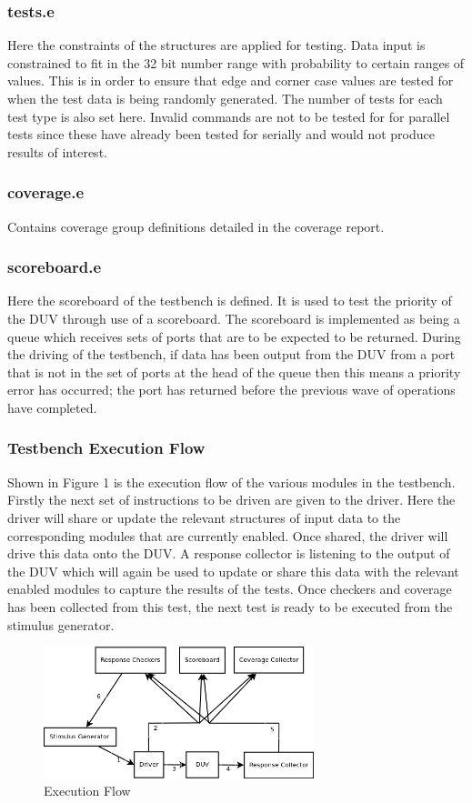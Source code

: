 \documentclass[a4paper]{article}
\begin{document}
\subsubsection*{tests.e}
\vspace{-0.7em}
Here the constraints of the structures are applied for testing. Data input is
constrained to fit in the 32 bit number range with probability to certain
ranges of values. This is in order to ensure that edge and corner case values
are tested for when the test data is being randomly generated. The number of
tests for each test type is also set here. Invalid commands are not to be
tested for for parallel tests since these have already been tested for serially
and would not produce results of interest.

\subsubsection*{coverage.e}
\vspace{-0.7em}
Contains coverage group definitions detailed in the coverage report.

\subsubsection*{scoreboard.e}
\vspace{-0.7em}
Here the scoreboard of the testbench is defined. It is used to test the
priority of the DUV through use of a scoreboard. The scoreboard is implemented
as being a queue which receives sets of ports that are to be expected to be
returned. During the driving of the testbench, if data has been output from the
DUV from a port that is not in the set of ports at the head of the queue then
this means a priority error has occurred; the port has returned before the
previous wave of operations have completed.

\subsubsection*{Testbench Execution Flow}
\vspace{-0.7em}
Shown in Figure 1 is the execution flow of the various modules in the
testbench. Firstly the next set of instructions to be driven are given
to the driver. Here the driver will share or update the relevant structures of
input data to the corresponding modules that are currently enabled. Once
shared, the driver will drive this data onto the DUV. A response collector is
listening to the output of the DUV which will again be used to update or share
this data with the relevant enabled modules to capture the results of the
tests. Once checkers and coverage has been collected from this test, the next
test is ready to be executed from the stimulus generator.
\vspace{-10em}

\begin{figure}
    \centering
    \caption{Execution Flow}
    \includegraphics[width=0.7\textwidth]{TestbenchFlow.png}
\end{figure}
\end{document}
